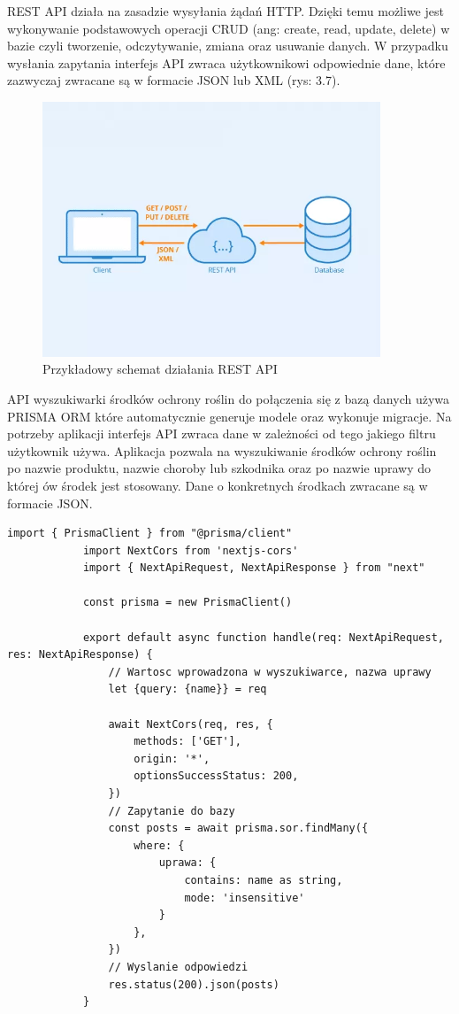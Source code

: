\documentclass[a4paper,12pt,oneside]{book}
\begin{document}
		\newpage
		
		REST API działa na zasadzie wysyłania żądań HTTP. Dzięki temu możliwe jest wykonywanie podstawowych operacji CRUD (ang: create, read, update, delete) w bazie czyli tworzenie, odczytywanie, zmiana oraz usuwanie danych. W przypadku wysłania zapytania interfejs API zwraca użytkownikowi odpowiednie dane, które zazwyczaj zwracane są w formacie JSON lub XML (rys: 3.7).
	
		\begin{figure}[H]
			\centering
			\includegraphics[width=0.9\textwidth]{grafika/restapi.png}
			\caption{Przykładowy schemat działania REST API}
		\end{figure}
	
		API wyszukiwarki środków ochrony roślin do połączenia się z bazą danych używa PRISMA ORM które automatycznie generuje modele oraz wykonuje migracje. Na potrzeby aplikacji interfejs API zwraca dane w zależności od tego jakiego filtru użytkownik używa. Aplikacja pozwala na wyszukiwanie środków ochrony roślin po nazwie produktu, nazwie choroby lub szkodnika oraz po nazwie uprawy do której ów środek jest stosowany. Dane o konkretnych środkach zwracane są w formacie JSON.
		
		\newpage
		
		\begin{lstlisting}[caption=Kod API filtru wyszukiwania po nazwie uprawy]
			import { PrismaClient } from "@prisma/client"
			import NextCors from 'nextjs-cors'
			import { NextApiRequest, NextApiResponse } from "next"
			
			const prisma = new PrismaClient()
			
			export default async function handle(req: NextApiRequest, res: NextApiResponse) {
				// Wartosc wprowadzona w wyszukiwarce, nazwa uprawy 
				let {query: {name}} = req
				
				await NextCors(req, res, {
					methods: ['GET'],
					origin: '*',
					optionsSuccessStatus: 200,
				})
				// Zapytanie do bazy
				const posts = await prisma.sor.findMany({
					where: {
						uprawa: {
							contains: name as string,
							mode: 'insensitive'
						}
					},
				})
				// Wyslanie odpowiedzi
				res.status(200).json(posts)
			}
		\end{lstlisting}
	
\end{document}
